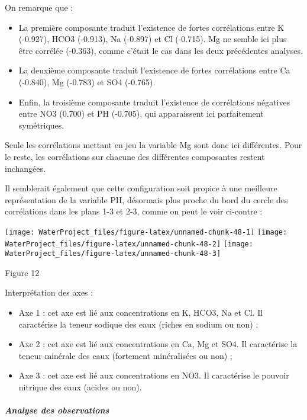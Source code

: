 \documentclass[]{article}
\providecommand{\tightlist}{%
  \setlength{\itemsep}{0pt}\setlength{\parskip}{0pt}}
\let\oldsubparagraph\subparagraph
\renewcommand{\subparagraph}[1]{\oldsubparagraph{#1}\mbox{}}
\begin{document}
On remarque que :

\begin{itemize}
\tightlist
\item
  La première composante traduit l'existence de fortes corrélations
  entre K (-0.927), HCO3 (-0.913), Na (-0.897) et Cl (-0.715). Mg ne
  semble ici plus être corrélée (-0.363), comme c'était le cas dans les
  deux précédentes analyses.
\item
  La deuxième composante traduit l'existence de fortes corrélations
  entre Ca (-0.840), Mg (-0.783) et SO4 (-0.765).
\item
  Enfin, la troisième composante traduit l'existence de corrélations
  négatives entre NO3 (0.700) et PH (-0.705), qui apparaissent ici
  parfaitement symétriques.
\end{itemize}

Seule les corrélations mettant en jeu la variable Mg sont donc ici
différentes. Pour le reste, les corrélations sur chacune des différentes
composantes restent inchangées.

Il semblerait également que cette configuration soit propice à une
meilleure représentation de la variable PH, désormais plus proche du
bord du cercle des corrélations dans les plans 1-3 et 2-3, comme on peut
le voir ci-contre :

\texttt{[image: WaterProject\_files/figure-latex/unnamed-chunk-48-1]}
\texttt{[image: WaterProject\_files/figure-latex/unnamed-chunk-48-2]}
\texttt{[image: WaterProject\_files/figure-latex/unnamed-chunk-48-3]}

Figure 12

Interprétation des axes :

\begin{itemize}
\tightlist
\item
  Axe 1 : cet axe est lié aux concentrations en K, HCO3, Na et Cl. Il
  caractérise la teneur sodique des eaux (riches en sodium ou non) ;
\item
  Axe 2 : cet axe est lié aux concentrations en Ca, Mg et SO4. Il
  caractérise la teneur minérale des eaux (fortement minéralisées ou
  non) ;
\item
  Axe 3 : cet axe est lié aux concentrations en NO3. Il caractérise le
  pouvoir nitrique des eaux (acides ou non).
\end{itemize}

\subparagraph{Analyse des
observations}\label{analyse-des-observations-2}
\end{document}
